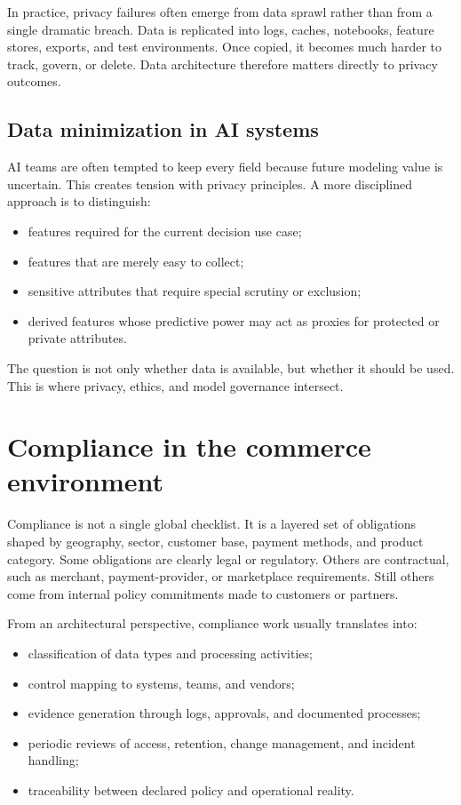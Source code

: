 In practice, privacy failures often emerge from data sprawl rather than from a single dramatic breach. Data is replicated into logs, caches, notebooks, feature stores, exports, and test environments. Once copied, it becomes much harder to track, govern, or delete. Data architecture therefore matters directly to privacy outcomes.

\subsection{Data minimization in AI systems}
AI teams are often tempted to keep every field because future modeling value is uncertain. This creates tension with privacy principles. A more disciplined approach is to distinguish:
\begin{itemize}
  \item features required for the current decision use case;
  \item features that are merely easy to collect;
  \item sensitive attributes that require special scrutiny or exclusion;
  \item derived features whose predictive power may act as proxies for protected or private attributes.
\end{itemize}

The question is not only whether data is available, but whether it should be used. This is where privacy, ethics, and model governance intersect.

\section{Compliance in the commerce environment}
Compliance is not a single global checklist. It is a layered set of obligations shaped by geography, sector, customer base, payment methods, and product category. Some obligations are clearly legal or regulatory. Others are contractual, such as merchant, payment-provider, or marketplace requirements. Still others come from internal policy commitments made to customers or partners.

From an architectural perspective, compliance work usually translates into:
\begin{itemize}
  \item classification of data types and processing activities;
  \item control mapping to systems, teams, and vendors;
  \item evidence generation through logs, approvals, and documented processes;
  \item periodic reviews of access, retention, change management, and incident handling;
  \item traceability between declared policy and operational reality.
\end{itemize}

